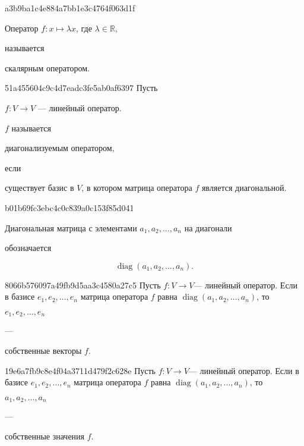 \begin{note}{a3b9ba1c4e884a7bb1e3c4764f063d1f}
    \begin{icloze}{2}Оператор \( f : x \mapsto \lambda x \), где \( \lambda \in \mathbb R \),\end{icloze} называется \begin{icloze}{1}скалярным оператором.\end{icloze}
\end{note}

\begin{note}{51a455604c9c4d7eadc3fe5ab0af6397}
    Пусть \begin{icloze}{3}\( f : V \to V \) --- линейный оператор.\end{icloze}
    \( f \) называется \begin{icloze}{2}диагонализуемым оператором,\end{icloze} если \begin{icloze}{1}существует базис в \( V \), в котором матрица оператора \( f \) является диагональной.\end{icloze}
\end{note}

\begin{note}{b01b69fc3ebc4c0c839a0c153f85d041}
    \begin{icloze}{1}Диагональная матрица с элементами \( a_1, a_2, \ldots, a_n \) на диагонали\end{icloze} обозначается
    \begin{icloze}{2}
        \[
            \operatorname{diag}(a_1, a_2, \ldots, a_n).
        \]
    \end{icloze}
\end{note}

\begin{note}{8066b576097a49fb9d5aa3c4580a27c5}
    Пусть \( f : V \to V \)--- линейный оператор.
    Если в базисе \( e_1, e_2, \ldots, e_n \) матрица оператора \( f \) равна \( \operatorname{diag} (a_1, a_2, \ldots, a_n) \), то \begin{icloze}{2}\( e_1, e_2, \ldots, e_n \)\end{icloze} --- \begin{icloze}{1}собственные векторы \( f \).\end{icloze}
\end{note}

\begin{note}{19e6a7fb9c8e4f04a3711d479f2c628e}
    Пусть \( f : V \to V \)--- линейный оператор.
    Если в базисе \( e_1, e_2, \ldots, e_n \) матрица оператора \( f \) равна \( \operatorname{diag} (a_1, a_2, \ldots, a_n) \), то \begin{icloze}{2}\( a_1, a_2, \ldots, a_n \)\end{icloze} --- \begin{icloze}{1}собственные значения \( f \).\end{icloze}
\end{note}

